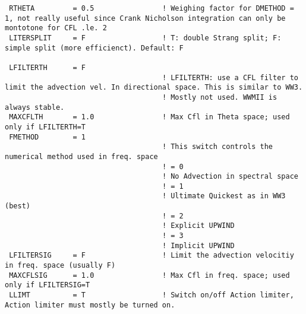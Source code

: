 \documentclass[12pt]{amsart}
\begin{document}
\begin{verbatim}
 RTHETA         = 0.5                ! Weighing factor for DMETHOD = 1, not really useful since Crank Nicholson integration can only be montotone for CFL .le. 2
 LITERSPLIT     = F                  ! T: double Strang split; F: simple split (more efficienct). Default: F

 LFILTERTH      = F
                                     ! LFILTERTH: use a CFL filter to limit the advection vel. In directional space. This is similar to WW3.
                                     ! Mostly not used. WWMII is always stable.
 MAXCFLTH       = 1.0                ! Max Cfl in Theta space; used only if LFILTERTH=T
 FMETHOD        = 1
                                     ! This switch controls the numerical method used in freq. space
                                     ! = 0
                                     ! No Advection in spectral space
                                     ! = 1
                                     ! Ultimate Quickest as in WW3 (best)
                                     ! = 2
                                     ! Explicit UPWIND 
                                     ! = 3
                                     ! Implicit UPWIND
 LFILTERSIG     = F                  ! Limit the advection velocitiy in freq. space (usually F)
 MAXCFLSIG      = 1.0                ! Max Cfl in freq. space; used only if LFILTERSIG=T
 LLIMT          = T                  ! Switch on/off Action limiter, Action limiter must mostly be turned on.


\end{verbatim}
\end{document}

